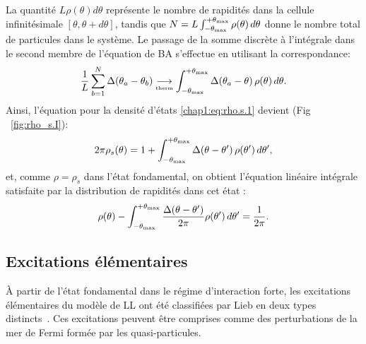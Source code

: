 La quantité \( L \rho(\theta) d\theta \) représente le nombre de rapidités dans la cellule infinitésimale \( [\theta, \theta + d\theta] \), tandis que
\(
	N = L \int_{-\theta_{\mbox{\tiny max}}}^{+\theta_{\mbox{\tiny max}}} \rho(\theta)\, d\theta
\)
donne le nombre total de particules dans le système. Le passage de la somme discrète à l'intégrale dans le second membre de l'équation de \gls{BA} s'effectue en utilisant la correspondance:
\begin{eqnarray}
	\frac{1}{L} \sum_{b = 1}^N \Delta(\theta_a - \theta_b) \underset{\text{\tiny therm}}{\longrightarrow }\int_{-\theta_{\mbox{\tiny max}}}^{+\theta_{\mbox{\tiny max}}} \Delta(\theta_a - \theta)\, \rho(\theta)\, d\theta.
\end{eqnarray}
Ainsi, l'équation pour la densité d'états \eqref{chap1:eq:rho.s.1} devient (Fig ~\ref{fig:rho_s.I}):
\begin{eqnarray}\label{chap.1.rho.s.2}
	2\pi \rho_s(\theta) = 1 + \int_{-\theta_{\mbox{\tiny max}}}^{+\theta_{\mbox{\tiny max}}} \Delta(\theta - \theta')\, \rho(\theta')\, d\theta',
\end{eqnarray}
et, comme \( \rho = \rho_s \) dans  l'état fondamental, on obtient l’équation linéaire intégrale satisfaite par la distribution de rapidités dans cet état :
\begin{eqnarray}\label{chap.1.rho.3}
	\rho(\theta) - \int_{-\theta_{\mbox{\tiny max}}}^{+\theta_{\mbox{\tiny max}}} \frac{\Delta(\theta - \theta')}{2\pi} \rho(\theta')\, d\theta' = \frac{1}{2\pi}.
\end{eqnarray}


\subsection{Excitations élémentaires}

À partir de l’état fondamental dans le régime d’interaction forte, les excitations élémentaires du modèle de \gls{LL} ont été classifiées par Lieb en deux types distincts~\cite{LL_1963_2}. Ces excitations peuvent être comprises comme des perturbations de la mer de Fermi formée par les quasi-particules.

